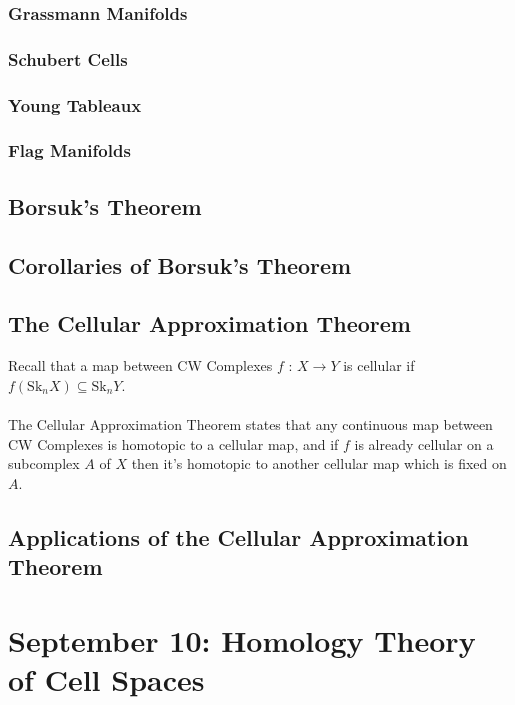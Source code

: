 \documentclass[11pt]{article}
\begin{document}
\subsubsection{Grassmann Manifolds}

\subsubsection*{Schubert Cells}

\subsubsection*{Young Tableaux}


\subsubsection{Flag Manifolds}

\subsection{Borsuk's Theorem}

\subsection{Corollaries of Borsuk's Theorem}

\subsection{The Cellular Approximation Theorem}
Recall that a map between CW Complexes $f \text{ : } X \rightarrow Y$ is cellular if $f(\mathrm{Sk}_n X) \subseteq \mathrm{Sk}_{n} Y$.
\\
\\
The Cellular Approximation Theorem states that any continuous map between CW Complexes is homotopic to a cellular map, and if $f$ is already cellular on a subcomplex $A$ of $X$ then it's homotopic to another cellular map which is fixed on $A$.

\subsection{Applications of the Cellular Approximation Theorem}

\newpage
\section{September 10: Homology Theory of Cell Spaces}
\end{document}
